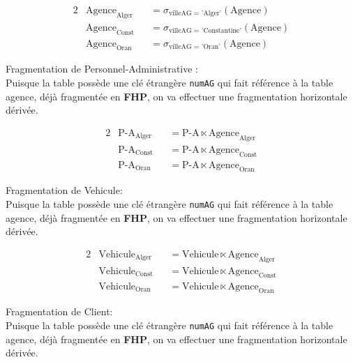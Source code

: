 \documentclass{article}
\begin{document}
\begin{alignat*}{2}
    &\text{Agence}_{\text{Alger}} &&= \sigma_{\text{villeAG = 'Alger'}} (\text{Agence})\\[0.1cm]
    &\text{Agence}_{\text{Const}} &&= \sigma_{\text{villeAG = 'Constantine'}} (\text{Agence})\\[0.1cm]
    &\text{Agence}_{\text{Oran}} &&= \sigma_{\text{villeAG = 'Oran'}} (\text{Agence})
\end{alignat*}

\vspace{0.25cm}

Fragmentation de Personnel-Administrative :\\[0.1cm]
Puisque la table possède une clé étrangère \texttt{numAG} qui fait référence à la table agence, déjà fragmentée en
\textbf{FHP}, on va effectuer une fragmentation horizontale dérivée.

\begin{alignat*}{2}
    &\text{P-A}_{\text{Alger}} &&= \text{P-A} \ltimes \text{Agence}_{\text{Alger}}\\[0.1cm]
    &\text{P-A}_{\text{Const}} &&= \text{P-A} \ltimes \text{Agence}_{\text{Const}}\\[0.1cm]
    &\text{P-A}_{\text{Oran}} &&= \text{P-A} \ltimes \text{Agence}_{\text{Oran}}
\end{alignat*}


\vspace{0.25cm}

Fragmentation de Vehicule:\\[0.1cm]
Puisque la table possède une clé étrangère \texttt{numAG} qui fait référence à la table agence, déjà fragmentée en
\textbf{FHP}, on va effectuer une fragmentation horizontale dérivée.

\begin{alignat*}{2}
    &\text{Vehicule}_{\text{Alger}} &&= \text{Vehicule} \ltimes \text{Agence}_{\text{Alger}}\\[0.1cm]
    &\text{Vehicule}_{\text{Const}} &&= \text{Vehicule} \ltimes \text{Agence}_{\text{Const}}\\[0.1cm]
    &\text{Vehicule}_{\text{Oran}} &&= \text{Vehicule} \ltimes \text{Agence}_{\text{Oran}}
\end{alignat*}

\vspace{0.25cm}

Fragmentation de Client:\\[0.1cm]
Puisque la table possède une clé étrangère \texttt{numAG} qui fait référence à la table agence, déjà fragmentée en
\textbf{FHP}, on va effectuer une fragmentation horizontale dérivée.
\end{document}

